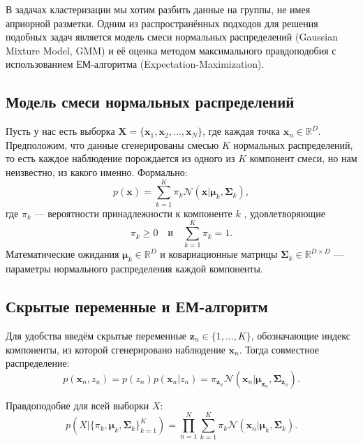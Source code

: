 В задачах кластеризации мы хотим разбить данные на группы, не имея априорной разметки. Одним из распространённых подходов для решения подобных задач является модель смеси нормальных распределений (Gaussian Mixture Model, GMM) и её оценка методом максимального правдоподобия с использованием ЕМ-алгоритма (Expectation-Maximization).

\subsection{Модель смеси нормальных распределений}

Пусть у нас есть выборка $\mathbf{X} = \{\mathbf{x}_1, \mathbf{x}_2, \ldots, \mathbf{x}_N\}$, где каждая точка $\mathbf{x}_n \in \mathbb{R}^D$. Предположим, что данные сгенерированы смесью $K$ нормальных распределений, то есть каждое наблюдение порождается из одного из $K$ компонент смеси, но нам неизвестно, из какого именно. Формально:
\begin{equation*}
p(\mathbf{x}) = \sum_{k=1}^{K} \pi_k \mathcal{N}(\mathbf{x}|\boldsymbol{\mu}_k, \boldsymbol{\Sigma}_k),
\end{equation*} 
где $\pi_k$ --- вероятности принадлежности к компоненте $k$ , удовлетворяющие 
\begin{equation*}
\pi_k \geq 0 \quad \text{и} \quad \sum_{k=1}^K \pi_k = 1.
\end{equation*} 
Математические ожидания $\boldsymbol{\mu}_k \in \mathbb{R}^D$ и ковариационные матрицы $\boldsymbol{\Sigma}_k \in \mathbb{R}^{D \times D}$ --- параметры нормального распределения каждой компоненты.

\subsection{Скрытые переменные и ЕМ-алгоритм}

Для удобства введём скрытые переменные $\mathbf{z}_n \in \{1,\ldots,K\}$, обозначающие индекс компоненты, из которой сгенерировано наблюдение $\mathbf{x}_n$. Тогда совместное распределение:
\begin{equation*}
p(\mathbf{x}_n, z_n) = p(z_n) p(\mathbf{x}_n | z_n) = \pi_{\mathbf{z}_n} \mathcal{N}(\mathbf{x}_n|\boldsymbol{\mu}_{\mathbf{z}_n}, \boldsymbol{\Sigma}_{\mathbf{z}_n}).
\end{equation*}

Правдоподобие для всей выборки $X$:
\begin{equation*}
p(X|\{\pi_k,\boldsymbol{\mu}_k,\boldsymbol{\Sigma}_k\}_{k=1}^K) = \prod_{n=1}^N \sum_{k=1}^K \pi_k \mathcal{N}(\mathbf{x}_n|\boldsymbol{\mu}_k, \boldsymbol{\Sigma}_k).
\end{equation*}

